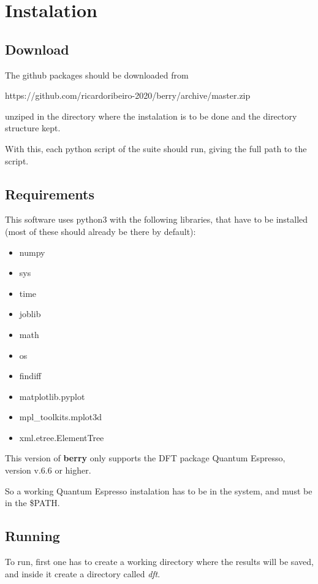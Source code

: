 \documentclass[a4paper,12pt]{report}
\begin{document}
\chapter{Instalation}

\section{Download}
The github packages should be downloaded from\medskip

 https://github.com/ricardoribeiro-2020/berry/archive/master.zip\medskip

unziped in the directory where the instalation is to be done and the directory structure kept.

With this, each python script of the suite should run, giving the full path to the script.

\section{Requirements}

This software uses python3 with the following libraries, that have to be installed
(most of these should already be there by default):
\begin{itemize}
 \item numpy
 \item sys
 \item time
 \item joblib
 \item math
 \item os
 \item findiff
 \item matplotlib.pyplot
 \item mpl\_toolkits.mplot3d
 \item xml.etree.ElementTree
\end{itemize}


This version of \textbf{berry} only supports the DFT package {\sc Quantum Espresso}, version v.6.6 or higher.

So a working {\sc Quantum Espresso} instalation has to be in the system, and must be in the \$PATH.

\section{Running}\label{sec:running}

 To run, first one has to create a working directory where the results will be saved,
 and inside it create a directory called \emph{dft}.
\end{document}
